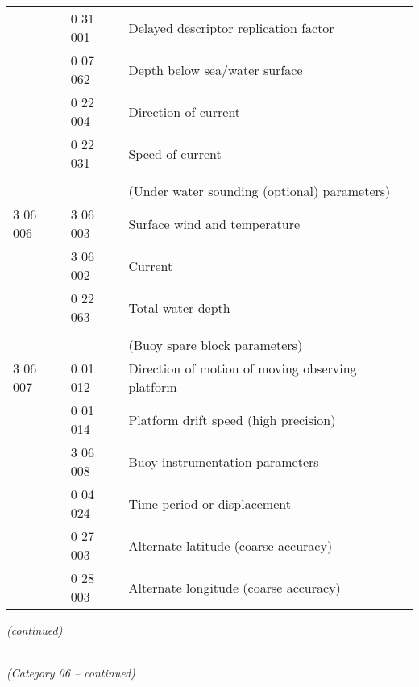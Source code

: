 \begin{longtable}[]{@{}llll@{}}
& 0 31 001 & Delayed descriptor replication factor &\tabularnewline
& 0 07 062 & Depth below sea/water surface &\tabularnewline
& 0 22 004 & Direction of current &\tabularnewline
& 0 22 031 & Speed of current &\tabularnewline
& & &\tabularnewline
& & (Under water sounding (optional) parameters) &\tabularnewline
3 06 006 & 3 06 003 & Surface wind and temperature &\tabularnewline
& 3 06 002 & Current &\tabularnewline
& 0 22 063 & Total water depth &\tabularnewline
& & &\tabularnewline
& & (Buoy spare block parameters) &\tabularnewline
3 06 007 & 0 01 012 & Direction of motion of moving observing platform &\tabularnewline
& 0 01 014 & Platform drift speed (high precision) &\tabularnewline
& 3 06 008 & Buoy instrumentation parameters &\tabularnewline
& 0 04 024 & Time period or displacement &\tabularnewline
& 0 27 003 & Alternate latitude (coarse accuracy) &\tabularnewline
& 0 28 003 & Alternate longitude (coarse accuracy) &\tabularnewline
\bottomrule
\end{longtable}

\emph{(continued)}

\emph{\\
(Category 06 -- continued)}

